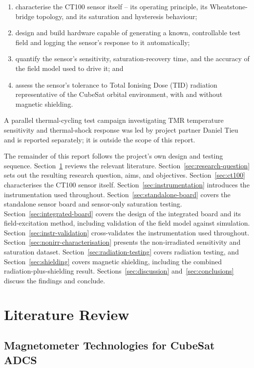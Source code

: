 \documentclass[12pt,a4paper]{article}
\begin{document}
\begin{enumerate}[label=(\roman*)]
\item characterise the CT100 sensor itself -- its operating principle, its Wheatstone-bridge topology, and its saturation and hysteresis behaviour;
\item design and build hardware capable of generating a known, controllable test field and logging the sensor's response to it automatically;
\item quantify the sensor's sensitivity, saturation-recovery time, and the accuracy of the field model used to drive it; and
\item assess the sensor's tolerance to Total Ionising Dose (TID) radiation representative of the CubeSat orbital environment, with and without magnetic shielding.
\end{enumerate}

A parallel thermal-cycling test campaign investigating TMR temperature sensitivity and thermal-shock response was led by project partner Daniel Tieu and is reported separately; it is outside the scope of this report.

The remainder of this report follows the project's own design and testing sequence. Section~\ref{sec:litreview} reviews the relevant literature. Section~\ref{sec:research-question} sets out the resulting research question, aims, and objectives. Section~\ref{sec:ct100} characterises the CT100 sensor itself. Section~\ref{sec:instrumentation} introduces the instrumentation used throughout. Section~\ref{sec:standalone-board} covers the standalone sensor board and sensor-only saturation testing. Section~\ref{sec:integrated-board} covers the design of the integrated board and its field-excitation method, including validation of the field model against simulation. Section~\ref{sec:instr-validation} cross-validates the instrumentation used throughout. Section~\ref{sec:nonirr-characterisation} presents the non-irradiated sensitivity and saturation dataset. Section~\ref{sec:radiation-testing} covers radiation testing, and Section~\ref{sec:shielding} covers magnetic shielding, including the combined radiation-plus-shielding result. Sections~\ref{sec:discussion} and~\ref{sec:conclusions} discuss the findings and conclude.

\section{Literature Review}
\label{sec:litreview}

\subsection{Magnetometer Technologies for CubeSat ADCS}
\label{sec:magnetometer-tech}
\end{document}
